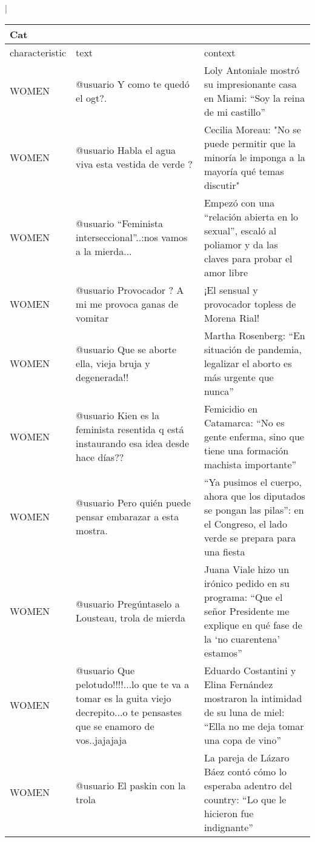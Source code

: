 \begin{table}
    \centering|
    \begin{tabular}{p{} p{} p{}}
        \toprule
        Cat & & \\
        \midrule
        characteristic & text & context \\
        \midrule
                 WOMEN & @usuario Y como te quedó el ogt?. & Loly Antoniale mostró su impresionante casa en Miami: “Soy la reina de mi castillo” \\
                 WOMEN & @usuario Habla el agua viva esta vestida de verde ? & Cecilia Moreau: "No se puede permitir que la minoría le imponga a la mayoría qué temas discutir" \\
                 WOMEN & @usuario “Feminista interseccional”..:nos vamos a la mierda... & Empezó con una “relación abierta en lo sexual”, escaló al poliamor y da las claves para probar el amor libre \\
                 WOMEN & @usuario Provocador ? A mi me provoca ganas de vomitar & ¡El sensual y provocador topless de Morena Rial! \\
                 WOMEN & @usuario Que se aborte ella, vieja  bruja y degenerada!! & Martha Rosenberg: “En situación de pandemia, legalizar el aborto es más urgente que nunca” \\
                 WOMEN & @usuario Kien es la feminista resentida q está instaurando esa idea desde hace días?? & Femicidio en Catamarca: “No es gente enferma, sino que tiene una formación machista importante” \\
                 WOMEN & @usuario Pero quién puede pensar embarazar a esta mostra. & “Ya pusimos el cuerpo, ahora que los diputados se pongan las pilas”: en el Congreso, el lado verde se prepara para una fiesta \\
                 WOMEN & @usuario Pregúntaselo a Lousteau, trola de mierda & Juana Viale hizo un irónico pedido en su programa: “Que el señor Presidente me explique en qué fase de la ‘no cuarentena’ estamos” \\
                 WOMEN & @usuario Que pelotudo!!!!...lo que te va a tomar es la guita viejo decrepito...o te pensastes que se enamoro de vos..jajajaja & Eduardo Costantini y Elina Fernández mostraron la intimidad de su luna de miel: “Ella no me deja tomar una copa de vino” \\
                 WOMEN & @usuario El paskin con la trola & La pareja de Lázaro Báez contó cómo lo esperaba adentro del country: “Lo que le hicieron fue indignante” \\

\end{tabular}
\end{table}
